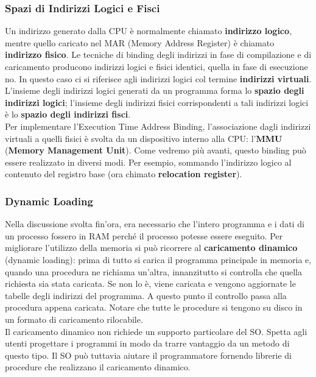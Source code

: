 \documentclass{article}
\begin{document}
			\subsubsection{Spazi di Indirizzi Logici e Fisci}
				Un indirizzo generato dalla CPU è normalmente chiamato \textbf{indirizzo logico}, mentre quello caricato nel MAR (Memory Address Register) è chiamato \textbf{indirizzo fisico}. Le tecniche di binding degli indirizzi in fase di compilazione e di caricamento producono indirizzi logici e fisici identici, quella in fase di esecuzione no. In questo caso ci si riferisce agli indirizzi logici col termine \textbf{indirizzi virtuali}.
				\\L'insieme degli indirizzi logici generati da un programma forma lo \textbf{spazio degli indirizzi logici}; l'insieme degli indirizzi fisici corrispondenti a tali indirizzi logici è lo \textbf{spazio degli indirizzi fisci}.
				\\Per implementare l'Execution Time Address Binding,  l'associazione dagli indirizzi virtuali a quelli fisici è svolta da un dispositivo interno alla CPU: l'\textbf{MMU} (\textbf{Memory Management Unit}). Come vedremo più avanti, questo binding può essere realizzato in diversi modi. Per esempio, sommando l'indirizzo logico al contenuto del registro base (ora chimato \textbf{relocation register}).
				\begin{figure}[ht!]
				\end{figure}

			\subsubsection{Dynamic Loading}
				Nella discussione svolta fin’ora, era necessario che l’intero programma e i dati di un processo fossero in RAM perché il processo potesse essere eseguito. Per migliorare l’utilizzo della memoria si può ricorrere al \textbf{caricamento dinamico} (dynamic loading): prima di tutto si carica il programma principale in memoria e, quando una procedura ne richiama un’altra, innanzitutto si controlla che quella richiesta sia stata caricata. Se non lo è, viene caricata e vengono aggiornate le tabelle degli indirizzi del programma. A questo punto il controllo passa alla procedura appena caricata. Notare che tutte le procedure si tengono su disco in un formato di caricamento rilocabile.
				\\Il caricamento dinamico non richiede un supporto particolare del SO. Spetta agli utenti progettare i programmi in modo da trarre vantaggio da un metodo di questo tipo. Il SO può tuttavia aiutare il programmatore fornendo librerie di procedure che realizzano il caricamento dinamico.
			
\end{document}
